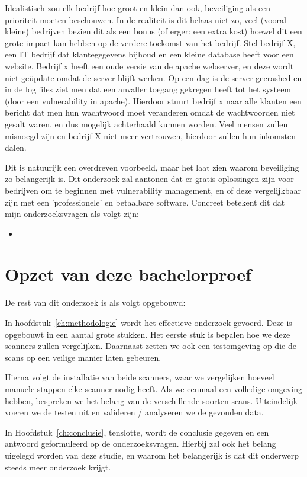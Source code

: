 Idealistisch zou elk bedrijf hoe groot en klein dan ook, beveiliging als een prioriteit moeten beschouwen. In de realiteit is dit helaas niet zo, veel (vooral kleine) bedrijven bezien dit als een bonus (of erger: een extra kost) hoewel dit een grote impact kan hebben op de verdere toekomst van het bedrijf. Stel bedrijf X, een IT bedrijf dat klantegegevens bijhoud en een kleine database heeft voor een website. Bedrijf x heeft een oude versie van de apache webserver, en deze wordt niet geüpdate omdat de server blijft werken. Op een dag is de server gecrashed en in de log files ziet men dat een anvaller toegang gekregen heeft tot het systeem (door een vulnerability in apache). Hierdoor stuurt bedrijf x naar alle klanten een bericht dat men hun wachtwoord moet veranderen omdat de wachtwoorden niet gesalt waren, en dus mogelijk achterhaald kunnen worden. Veel mensen zullen misnoegd zijn en bedrijf X niet meer vertrouwen, hierdoor zullen hun inkomsten dalen.


Dit is natuurijk een overdreven voorbeeld, maar het laat zien waarom beveiliging zo belangerijk is. Dit onderzoek zal aantonen dat er gratis oplossingen zijn voor bedrijven om te beginnen met vulnerability management, en of deze vergelijkbaar zijn met een 'professionele' en betaalbare software. Concreet betekent dit dat mijn onderzoeksvragen als volgt zijn:

\begin{itemize}
\item 
\end{itemize}


\section{Opzet van deze bachelorproef}
\label{sec:opzet-bachelorproef}

De rest van dit onderzoek is als volgt opgebouwd:

In hoofdstuk~\ref{ch:methodologie} wordt het effectieve onderzoek gevoerd. Deze is opgebouwt in een aantal grote stukken. Het eerste stuk is bepalen hoe we deze scanners zullen vergelijken. Daarnaast zetten we ook een testomgeving op die de scans op een veilige manier laten gebeuren. 

Hierna volgt de installatie van beide scanners, waar we vergelijken hoeveel manuele stappen elke scanner nodig heeft. Als we eenmaal een volledige omgeving hebben, bespreken we het belang van de verschillende soorten scans. Uiteindelijk voeren we de testen uit en valideren / analyseren we de gevonden data.

In Hoofdstuk~\ref{ch:conclusie}, tenslotte, wordt de conclusie gegeven en een antwoord geformuleerd op de onderzoeksvragen. Hierbij zal ook het belang uigelegd worden van deze studie, en waarom het belangerijk is dat dit onderwerp steeds meer onderzoek krijgt.

